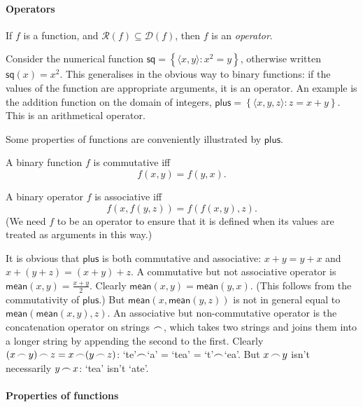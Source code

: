 \paragraph{Operators}
\begin{definition}[Operator]
	If $f$ is a function, and $\mathcal{R}(f) \subseteq \mathcal{D}(f)$, then $f$ is an \emph{operator}.
\end{definition}
Consider the numerical function $\mathsf{sq} = \left\{\langle x,y\rangle: x^{2} = y\right\}$, otherwise written $\mathsf{sq}(x) = x^2$. This generalises in the obvious way to binary functions: if the values of the function are appropriate arguments, it is an operator. An example is the addition function on the domain of integers, $\mathsf{plus} = \left\{\langle x, y, z\rangle : z = x + y\right\}$. This is an arithmetical operator.

Some properties of functions are conveniently illustrated by $\mathsf{plus}$.
\begin{definition}[Commutative]
	A binary function $f$ is commutative iff $$f(x,y) = f(y,x).$$  
\end{definition}
\begin{definition}[Associative]
	A binary operator $f$ is associative iff $$f(x,f(y,z)) = f(f(x,y),z).$$ (We need $f$ to be an operator to ensure that it is defined when its values are treated as arguments in this way.)
\end{definition}
It is obvious that $\mathsf{plus}$ is both commutative and associative: $x+y=y+x$ and $x+(y+z)=(x+y)+z$. A commutative but not associative operator is $\mathsf{mean}(x,y) = \tfrac{x+y}{2}$. Clearly $\mathsf{mean}(x,y)=\mathsf{mean}(y,x)$. (This follows from the commutativity of $\mathsf{plus}$.) But $\mathsf{mean}(x,\mathsf{mean}(y,z))$ is not in general equal to $\mathsf{mean}(\mathsf{mean}(x,y),z)$. An associative but non-commutative operator is the concatenation operator on strings $\mathop{\frown}$, which takes two strings and joins them into a longer string by appending the second to the first. Clearly $(x\mathop{\frown} y)\mathop{\frown} z = x \mathop{\frown} (y\mathop{\frown} z)$: `te'$\mathop{\frown}$`a' = `tea' = `t'$\mathop{\frown}$`ea'. But $x\mathop{\frown} y$ isn't necessarily $y\mathop{\frown} x$: `tea' isn't `ate'.



\paragraph{Properties of functions}

